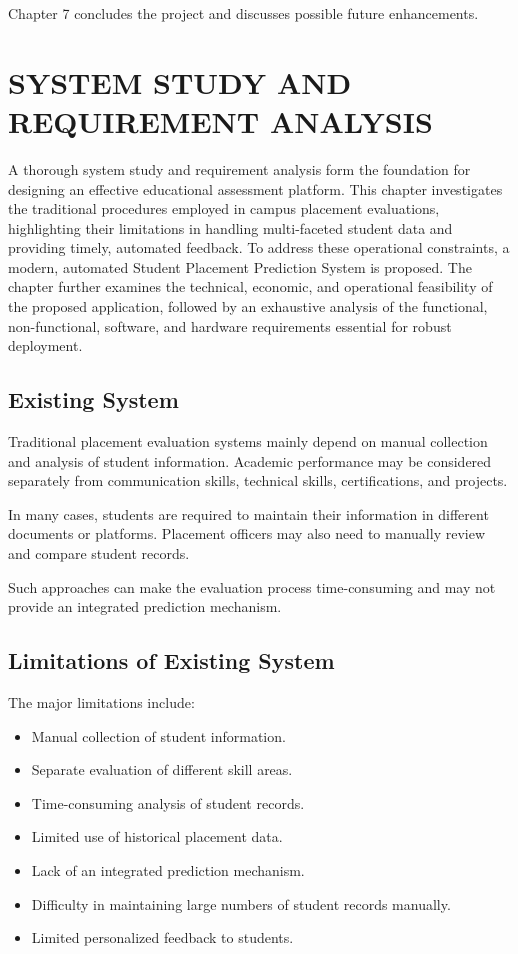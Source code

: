 \documentclass[12pt,a4paper]{report}
\begin{document}
Chapter 7 concludes the project and discusses possible future
enhancements.


\chapter{SYSTEM STUDY AND REQUIREMENT ANALYSIS}

A thorough system study and requirement analysis form the foundation for
designing an effective educational assessment platform. This chapter
investigates the traditional procedures employed in campus placement
evaluations, highlighting their limitations in handling multi-faceted student
data and providing timely, automated feedback. To address these operational
constraints, a modern, automated Student Placement Prediction System is
proposed. The chapter further examines the technical, economic, and
operational feasibility of the proposed application, followed by an exhaustive
analysis of the functional, non-functional, software, and hardware requirements
essential for robust deployment.

\section{Existing System}

Traditional placement evaluation systems mainly depend on manual
collection and analysis of student information. Academic
performance may be considered separately from communication
skills, technical skills, certifications, and projects.

In many cases, students are required to maintain their
information in different documents or platforms. Placement
officers may also need to manually review and compare student
records.

Such approaches can make the evaluation process time-consuming
and may not provide an integrated prediction mechanism.

\section{Limitations of Existing System}

The major limitations include:

\begin{itemize}
    \item Manual collection of student information.
    \item Separate evaluation of different skill areas.
    \item Time-consuming analysis of student records.
    \item Limited use of historical placement data.
    \item Lack of an integrated prediction mechanism.
    \item Difficulty in maintaining large numbers of student
    records manually.
    \item Limited personalized feedback to students.
\end{itemize}
\end{document}
